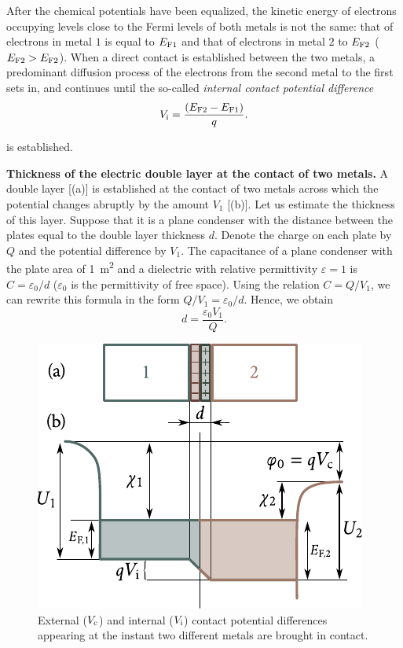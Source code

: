After the chemical potentials have been equalized, the kinetic energy of electrons occupying levels close to the Fermi levels of both metals is not the same: that of electrons in metal $1$ is equal to $E_{\text{F$1$}}$ and that of electrons in metal $2$ to $E_{\text{F$2$}}$ ($E_{\text{F$2$}}>E_{\text{F$2$}}$). When a direct contact is established between the two metals, a predominant diffusion process of the electrons from the second metal to the first sets in, and continues until the so-called \textit{internal contact potential difference}
\begin{equation}\label{eq:8_2}
    V_{\text{i}} = \frac{(E_{\text{F$2$}} - E_{\text{F$1$}})}{q}.
\end{equation}

\noindent
is established.

\textbf{Thickness of the electric double layer at the contact of two metals.} A double layer [(a)] is established at the contact of two metals across which the potential changes abruptly by the amount $V_1$ [(b)]. Let us estimate the thickness of this layer. Suppose that it is a plane condenser with the distance between the plates equal to the double layer thickness $d$. Denote the charge on each plate by $Q$ and the potential difference by $V_1$. The capacitance of a plane condenser with the plate area of \SI{1}{\metre\squared} and a dielectric with relative
permittivity $\varepsilon=1$ is $C=\varepsilon_0/d$ ($\varepsilon_0$ is the permittivity of free space).
Using the relation $C=Q/V_1$, we can rewrite this formula in the form $Q/V_1=\varepsilon_0/d$. Hence, we obtain
\begin{equation*}
    d = \frac{\varepsilon_0 V_1}{Q}.
\end{equation*}

\begin{figure}[t]
	\begin{center}
		\includegraphics[scale=1]{figures/ch_08/fig_8_5.pdf}
		\caption[]{External ($V_{\text{c}}$) and internal ($V_{\text{i}}$) contact potential differences appearing at the instant two different metals are brought in contact.}
		\label{fig:8_5}
	\end{center}
	\vspace{-0.8cm}
\end{figure}


